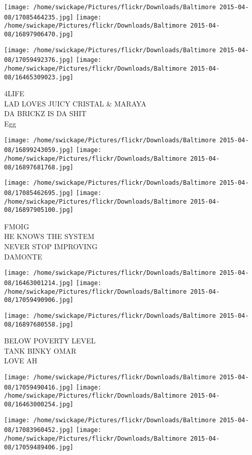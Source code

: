 \documentclass[10pt,letterpaper]{article}
\begin{document}
\texttt{[image: /home/swickape/Pictures/flickr/Downloads/Baltimore 2015-04-08/17085464235.jpg]}
\texttt{[image: /home/swickape/Pictures/flickr/Downloads/Baltimore 2015-04-08/16897906470.jpg]}

\texttt{[image: /home/swickape/Pictures/flickr/Downloads/Baltimore 2015-04-08/17059492376.jpg]}
\texttt{[image: /home/swickape/Pictures/flickr/Downloads/Baltimore 2015-04-08/16465309023.jpg]}

4LIFE\\
LAD LOVES JUICY CRISTAL \& MARAYA\\
DA BRICKZ IS DA SHIT\\
Egg\\
\pagebreak

\texttt{[image: /home/swickape/Pictures/flickr/Downloads/Baltimore 2015-04-08/16899243059.jpg]}
\texttt{[image: /home/swickape/Pictures/flickr/Downloads/Baltimore 2015-04-08/16897681768.jpg]}

\texttt{[image: /home/swickape/Pictures/flickr/Downloads/Baltimore 2015-04-08/17085462695.jpg]}
\texttt{[image: /home/swickape/Pictures/flickr/Downloads/Baltimore 2015-04-08/16897905100.jpg]}

FMOIG\\
HE KNOWS THE SYSTEM\\
NEVER STOP IMPROVING\\
DAMONTE\\
\pagebreak

\texttt{[image: /home/swickape/Pictures/flickr/Downloads/Baltimore 2015-04-08/16463001214.jpg]}
\texttt{[image: /home/swickape/Pictures/flickr/Downloads/Baltimore 2015-04-08/17059490906.jpg]}

\vspace{0.25in}
\texttt{[image: /home/swickape/Pictures/flickr/Downloads/Baltimore 2015-04-08/16897680558.jpg]}

BELOW POVERTY LEVEL\\
TANK BINKY OMAR\\
LOVE AH\\
\pagebreak

\texttt{[image: /home/swickape/Pictures/flickr/Downloads/Baltimore 2015-04-08/17059490416.jpg]}
\texttt{[image: /home/swickape/Pictures/flickr/Downloads/Baltimore 2015-04-08/16463000254.jpg]}

\texttt{[image: /home/swickape/Pictures/flickr/Downloads/Baltimore 2015-04-08/17083960452.jpg]}
\texttt{[image: /home/swickape/Pictures/flickr/Downloads/Baltimore 2015-04-08/17059489406.jpg]}
\end{document}
